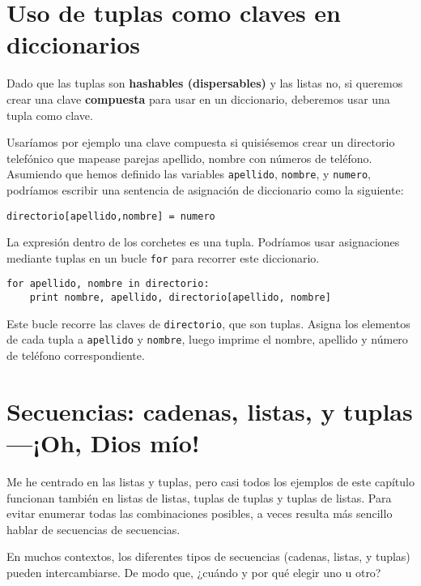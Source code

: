 \section{Uso de tuplas como claves en diccionarios}


Dado que las tuplas son {\bf hashables (dispersables)} y las listas no, si queremos
crear una clave {\bf compuesta} para usar en un diccionario, deberemos usar una tupla
como clave.

Usaríamos por ejemplo una clave compuesta si quisiésemos crear un
directorio telefónico que mapease
parejas apellido, nombre con números de teléfono. Asumiendo
que hemos definido las variables
{\tt apellido}, {\tt nombre}, y {\tt numero}, podríamos escribir
una sentencia de asignación de diccionario como la siguiente:

\beforeverb
\begin{verbatim}
directorio[apellido,nombre] = numero
\end{verbatim}
\afterverb
%
La expresión dentro de los corchetes es una tupla. Podríamos usar
asignaciones mediante tuplas en un bucle {\tt for} para recorrer este diccionario.


\beforeverb
\begin{verbatim}
for apellido, nombre in directorio:
    print nombre, apellido, directorio[apellido, nombre]
\end{verbatim}
\afterverb
%
Este bucle recorre las claves de {\tt directorio}, que son tuplas.
Asigna los elementos de cada tupla a {\tt apellido} y {\tt nombre}, luego
imprime el nombre, apellido y número de teléfono correspondiente.

\section{Secuencias: cadenas, listas, y tuplas---¡Oh, Dios mío!}

Me he centrado en las listas y tuplas, pero casi todos los ejemplos de
este capítulo funcionan también en listas de listas, tuplas de tuplas y
tuplas de listas. Para evitar enumerar todas las combinaciones posibles,
a veces resulta más sencillo hablar de secuencias de secuencias.

En muchos contextos, los diferentes tipos de secuencias (cadenas, listas, y
tuplas) pueden intercambiarse. De modo que, ¿cuándo y por qué elegir uno
u otro?

